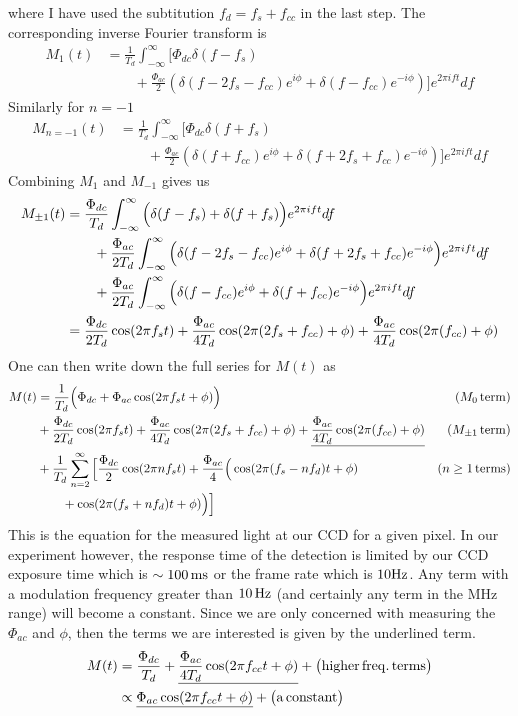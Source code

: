 \noindent 
where I have used the subtitution $f_d=f_s+f_{cc}$ in the last step. The corresponding inverse Fourier transform is
\begin{align}
M_{1}(t)
&= \frac{1}{T_{d}} \int_{-\infty}^{\infty} \Big[\Phi_{dc}\delta(f-f_s) \\
& \qquad + \frac{\Phi_{ac}}{2} \left(\delta(f-2f_s-f_{cc})e^{i\phi}+\delta(f-f_{cc})e^{-i\phi}\right)\Big] e^{2 \pi i f t}df
\end{align}
 Similarly for $n=-1$
\begin{align}
M_{n=-1}(t)
&= \frac{1}{T_{d}} \int_{-\infty}^{\infty} \Big[\Phi_{dc}\delta(f+f_s) \\
& \qquad + \frac{\Phi_{ac}}{2} \left(\delta(f+f_{cc})e^{i\phi}+\delta(f+2f_s+f_{cc})e^{-i\phi}\right)\Big] e^{2 \pi i f t}df
\end{align}
Combining $M_1$ and $M_{-1}$ gives us
\begin{align}
M_{\pm 1}(t)
&= \frac{\Phi_{dc}}{T_{d}} \int_{-\infty}^{\infty} \Big(\delta(f-f_s)+\delta(f+f_s)\Big)e^{2 \pi i f t}df \notag \\
& \qquad + \frac{\Phi_{ac}}{2T_{d}} \int_{-\infty}^{\infty} \Big(\delta(f-2f_s-f_{cc})e^{i\phi} + \delta(f+2f_s+f_{cc})e^{-i\phi}\Big) e^{2 \pi i f t}df \notag \\
& \qquad + \frac{\Phi_{ac}}{2T_{d}} \int_{-\infty}^{\infty} \Big(\delta(f-f_{cc})e^{i\phi} + \delta(f+f_{cc})e^{-i\phi}\Big) e^{2 \pi i f t}df \notag\\
&=\frac{\Phi_{dc}}{2T_{d}} \cos(2\pi f_s t)+ \frac{\Phi_{ac}}{4T_{d}} \cos(2\pi(2f_s+f_{cc})+\phi) + \frac{\Phi_{ac}}{4T_{d} }\cos(2\pi(f_{cc})+\phi)
\end{align}
\noindent
One can then write down the full series for $M(t)$ as
\begin{align}
M(t)
&= \frac{1}{T_{d}}\Big(\Phi_{dc}+\Phi_{ac}\cos(2\pi f_st+\phi)\Big) & (M_0\,{\rm term}) \notag\\
& + \frac{\Phi_{dc}}{2T_{d}} \cos(2\pi f_s t)+ \frac{\Phi_{ac}}{4T_{d}} \cos(2\pi(2f_s+f_{cc})+\phi) + \underline{\frac{\Phi_{ac}}{4T_{d} }\cos(2\pi(f_{cc})+\phi)} & (M_{\pm 1}\,{\rm term}) \notag\\
& + \frac{1}{T_d}\sum_{n=2}^{\infty}\Big[\frac{\Phi_{dc}}{2} \cos(2 \pi n f_st) + \frac{\Phi_{ac}}{4}\Big(\cos(2 \pi(f_s-n f_d)t+\phi) & (n\geq 1\,{\rm terms}) \notag\\
& \qquad + \cos(2 \pi(f_s+n f_d)t+\phi)\Big)\Big] &
\end{align}
This is the equation for the measured light at our CCD for a given pixel. In our experiment however, the response time of the detection is limited by our CCD exposure time which is $\sim 100\,{\rm ms}$ or the frame rate which is $10 \rm{Hz}$. Any term with a modulation frequency greater than $10\,\rm{Hz}$ (and certainly any term in the MHz range) will become a constant. Since we are only concerned with measuring the $\Phi_{ac}$ and $\phi$, then the terms we are interested is given by the underlined term.
\begin{align}
\label{eqn:heterodyneresult}
M(t)
&= \frac{\Phi_{dc}}{T_d} + \underline{\frac{\Phi_{ac}}{4T_{d}}\cos(2\pi f_{cc} t+\phi)} + \big(\rm{higher\,freq.\,terms}\big) \notag\\
&\propto \underline{\Phi_{ac}\cos(2\pi f_{cc} t+\phi)} + \big(\rm{a\,constant}\big)
\end{align}